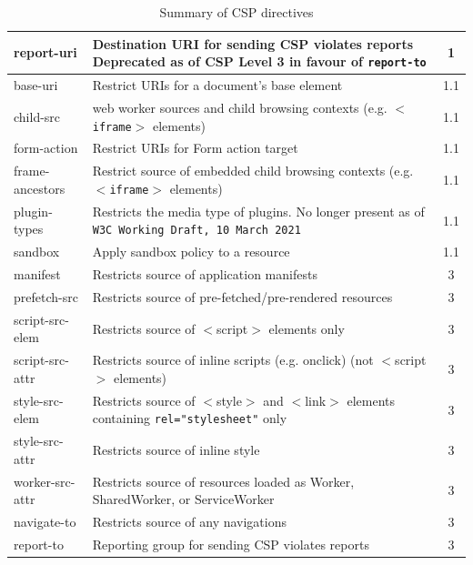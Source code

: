 \documentclass{mscreport}
\begin{document}
\begin{table}[h!]
\begin{center}
\begin{tabular}{|l|J|c|}
      \hline
      report-uri & Destination URI for sending CSP violates reports Deprecated as of CSP Level 3 in favour of \texttt{report-to} & 1\\
      \hline
      base-uri & Restrict URIs for a document's base element & 1.1\\
      \hline
      child-src & web worker sources and child browsing contexts (e.g. \texttt{$<$iframe$>$} elements) & 1.1\\
      \hline
      form-action & Restrict URIs for Form action target & 1.1\\
      \hline
      frame-ancestors & Restrict source of embedded child browsing contexts (e.g. \texttt{$<$iframe$>$} elements) & 1.1\\
      \hline
      plugin-types & Restricts the media type of plugins. No longer present as of \texttt{W3C Working Draft, 10 March 2021} \cite{noauthor_undated-xf} & 1.1\\
      \hline
      sandbox & Apply sandbox policy to a resource & 1.1\\
      \hline
      manifest & Restricts source of application manifests & 3 \\
      \hline
      prefetch-src & Restricts source of pre-fetched/pre-rendered resources & 3 \\
      \hline
      script-src-elem & Restricts source of $<$script$>$ elements only & 3 \\
      \hline
      script-src-attr & Restricts source of inline scripts (e.g. onclick) (not $<$script$>$ elements) & 3 \\
      \hline
      style-src-elem & Restricts source of $<$style$>$ and $<$link$>$ elements containing \texttt{rel="stylesheet"} only & 3 \\
      \hline
      style-src-attr & Restricts source of inline style & 3 \\
      \hline
      worker-src-attr & Restricts source of resources loaded as Worker, SharedWorker, or ServiceWorker & 3 \\
      \hline
      navigate-to & Restricts source of any navigations & 3 \\
      \hline
      report-to & Reporting group for sending CSP violates reports & 3 \\
      \hline
    \end{tabular}
    \caption{Summary of CSP directives}
    \label{table:cpsdirectives1} %
  \end{center}
\end{table}
\end{document}
